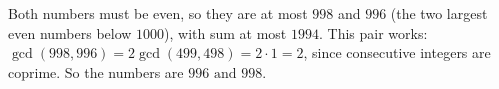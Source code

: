 Both numbers must be even, so they are at most $998$ and $996$ (the two largest even numbers below $1000$), with sum at most $1994$. This pair works: $\gcd(998,996)=2\gcd(499,498)=2\cdot1=2$, since consecutive integers are coprime. So the numbers are $\boxed{996\text{ and }998}$.
